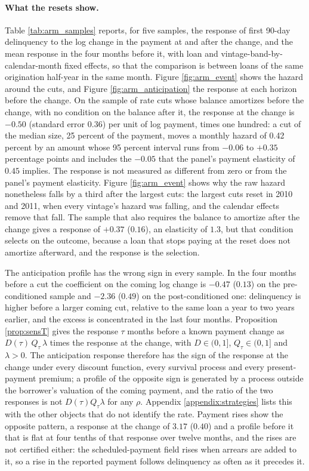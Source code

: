 \paragraph{What the resets show.} Table \ref{tab:arm_samples} reports, for five samples, the response of first 90-day delinquency to the log change in the payment at and after the change, and the mean response in the four months before it, with loan and vintage-band-by-calendar-month fixed effects, so that the comparison is between loans of the same origination half-year in the same month. Figure \ref{fig:arm_event} shows the hazard around the cuts, and Figure \ref{fig:arm_anticipation} the response at each horizon before the change. On the sample of rate cuts whose balance amortizes before the change, with no condition on the balance after it, the response at the change is $-0.50$ (standard error $0.36$) per unit of log payment, times one hundred: a cut of the median size, 25 percent of the payment, moves a monthly hazard of 0.42 percent by an amount whose 95 percent interval runs from $-0.06$ to $+0.35$ percentage points and includes the $-0.05$ that the panel's payment elasticity of $0.45$ implies. The response is not measured as different from zero or from the panel's payment elasticity. Figure \ref{fig:arm_event} shows why the raw hazard nonetheless falls by a third after the largest cuts: the largest cuts reset in 2010 and 2011, when every vintage's hazard was falling, and the calendar effects remove that fall. The sample that also requires the balance to amortize after the change gives a response of $+0.37$ ($0.16$), an elasticity of $1.3$, but that condition selects on the outcome, because a loan that stops paying at the reset does not amortize afterward, and the response is the selection.

The anticipation profile has the wrong sign in every sample. In the four months before a cut the coefficient on the coming log change is $-0.47$ ($0.13$) on the pre-conditioned sample and $-2.36$ ($0.49$) on the post-conditioned one: delinquency is higher before a larger coming cut, relative to the same loan a year to two years earlier, and the excess is concentrated in the last four months. Proposition \ref{prop:sensT} gives the response $\tau$ months before a known payment change as $D(\tau)\,Q_\tau\,\lambda$ times the response at the change, with $D\in(0,1]$, $Q_\tau\in(0,1]$ and $\lambda>0$. The anticipation response therefore has the sign of the response at the change under every discount function, every survival process and every present-payment premium; a profile of the opposite sign is generated by a process outside the borrower's valuation of the coming payment, and the ratio of the two responses is not $D(\tau)Q_\tau\lambda$ for any $\rho$. Appendix \ref{appendix:strategies} lists this with the other objects that do not identify the rate. Payment rises show the opposite pattern, a response at the change of $3.17$ ($0.40$) and a profile before it that is flat at four tenths of that response over twelve months, and the rises are not certified either: the scheduled-payment field rises when arrears are added to it, so a rise in the reported payment follows delinquency as often as it precedes it.

